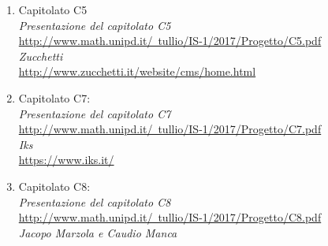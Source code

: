 \documentclass[StudioDiFattibilità.tex]{subfiles}
\begin{document}
\begin{enumerate}
	\item Capitolato C5\\
		\textit{Presentazione del capitolato C5}\\
		\href{http://www.math.unipd.it/~tullio/IS-1/2017/Progetto/C5.pdf}{http://www.math.unipd.it/~tullio/IS-1/2017/Progetto/C5.pdf}\\
		\textit{Zucchetti}\\
		\href{http://www.zucchetti.it/website/cms/home.html}{http://www.zucchetti.it/website/cms/home.html}\\
		
	\item Capitolato C7:\\
		\textit{Presentazione del capitolato C7}\\
		\href{http://www.math.unipd.it/~tullio/IS-1/2017/Progetto/C7.pdf}{http://www.math.unipd.it/~tullio/IS-1/2017/Progetto/C7.pdf}\\
		\textit{Iks}\\
		\href{https://www.iks.it/}{https://www.iks.it/}\\
		
	\item Capitolato C8:\\
		\textit{Presentazione del capitolato C8}\\
		\href{http://www.math.unipd.it/~tullio/IS-1/2017/Progetto/C8.pdf}{http://www.math.unipd.it/~tullio/IS-1/2017/Progetto/C8.pdf}\\
		\textit{Jacopo Marzola e Caudio Manca}\\
		
		
\end{enumerate}
	
\end{document}
